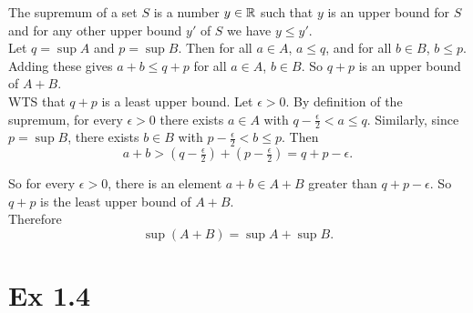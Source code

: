 \documentclass{report}
\begin{document}
\begin{proofWithHibiscus}
  The supremum of a set $S$ is a number $y \in \mathbb{R}$ such that $y$ is an upper bound for $S$ and for any other upper bound $y'$ of $S$ we have $y \leq y'$. \\

  Let $q = \sup A$ and $p = \sup B$. Then for all $a \in A$, $a \leq q$, and for all $b \in B$, $b \leq p$. Adding these gives $a+b \leq q+p$ for all $a \in A$, $b \in B$. So $q+p$ is an upper bound of $A+B$. \\

  WTS that $q + p$ is a least upper bound. Let $\epsilon > 0$.  
  By definition of the supremum, for every $\epsilon > 0$ there exists $a \in A$ with $q - \tfrac{\epsilon}{2} < a \leq q$.  
  Similarly, since $p = \sup B$, there exists $b \in B$ with $p - \tfrac{\epsilon}{2} < b \leq p$.  
  Then
  \[
    a+b > (q-\tfrac{\epsilon}{2}) + (p-\tfrac{\epsilon}{2}) = q+p - \epsilon.
  \]
  
  So for every $\epsilon > 0$, there is an element $a+b \in A+B$ greater than $q+p - \epsilon$. So $q+p$ is the least upper bound of $A+B$. \\

  Therefore
  \[
    \sup(A+B) = \sup A + \sup B.
  \]
\end{proofWithHibiscus}




\section*{Ex 1.4}
\end{document}

